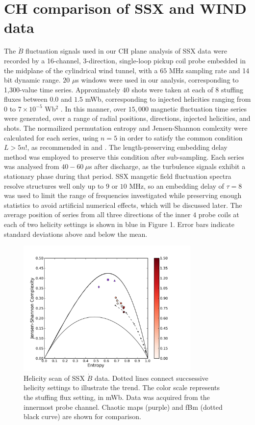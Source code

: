 \documentclass[aps,twocolumn,secnumarabic,nobalancelastpage,amsmath,amssymb,
nofootinbib]{revtex4-1}
\begin{document}
\section{CH comparison of SSX and WIND data}
The $\dot{B}$ fluctuation signals used in our CH plane analysis of SSX data  were recorded by a 16-channel, 3-direction, single-loop pickup coil probe embedded in the midplane of the cylindrical wind tunnel, with a $65$ MHz sampling rate and 14 bit dynamic range. $20$ $\mu$s windows were used in our analysis, corresponding to 1,300-value time series. Approximately $40$ shots were taken at each of $8$ stuffing fluxes between $0.0$ and $1.5$ mWb, corresponding to injected helicities ranging from $0$ to $7 \times 10^{-5}$ Wb$^2$ \cite{schaffner2014}. In this manner, over $15,000$ magnetic fluctuation time series were generated, over a range of radial positions, directions, injected helicities, and shots. The normailized permutation entropy and Jensen-Shannon comlexity were calculated for each series, using $n=5$ in order to satisfy the common condition $L > 5n!$, as recommended in \cite{amigo2008} and \cite{riedl2013}. The length-preserving embedding delay method was employed to preserve this condition after sub-sampling. Each series was analysed from $40-60~\mu$s after discharge, as the turbulence signals exhibit a stationary phase during that period. SSX mangetic field fluctuation spectra resolve structures well only up to $9$ or $10$ MHz, so an embedding delay of $\tau=8$ was used to limit the range of frequencies investigated while preserving enough statistics to avoid artificial numerical effects, which will be discussed later. The average position of series from all three directions of the inner $4$ probe coils at each of two helicity settings is shown in blue in Figure 1. Error bars indicate standard deviations above and below the mean.  

\begin{figure}[!htbp]
\centerline{
\includegraphics[width=9cm]{fig2.png}}
\caption{\label{Figure 2} Helicity scan of SSX $\dot{B}$ data. Dotted lines connect succsessive helicity settings to illustrate the trend. The color scale represents the stuffing flux setting, in mWb.  Data was acquired from the innermost probe channel. Chaotic maps (purple) and fBm (dotted black curve) are shown for comparison.}
\end{figure}
\end{document}
